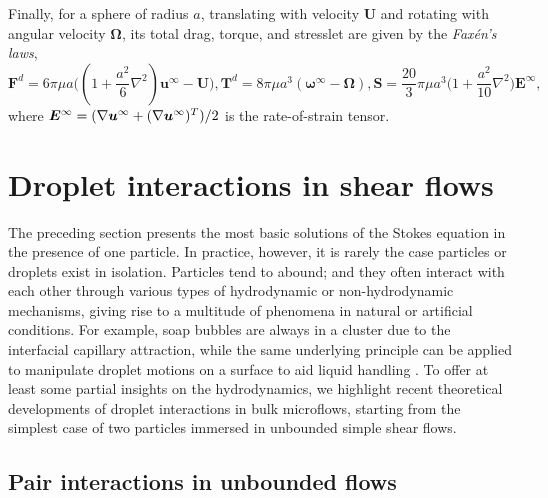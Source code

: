 Finally, for a sphere of radius $a$, translating with velocity $\bm U$ and rotating with angular velocity $\bm \Omega$, its total drag, torque, and stresslet are given by the \emph{Fax\'{e}n's laws},
\begin{subequations} \label{eq:faxen}
 \begin{equation}
   {\bm F}^{d} = 6\pi\mu a\bigg( (1+\frac{a^2}{6}\nabla^2){\bm u^\infty - {\bm U}} \bigg) ,
 \end{equation}
 \begin{equation}
  {\bm T}^{d} = 8\pi\mu a^3 ({\bm \omega}^\infty - {\bm \Omega}),
 \end{equation}
 \begin{equation}
   {\bm S} = \frac{20}{3}\pi\mu a^3 \bigg( 1+\frac{a^2}{10}\nabla^2 \bigg) {\bm E}^\infty ,
 \end{equation}
\end{subequations}
where $\small {\bm E}^\infty=(\nabla {\bm u}^\infty + (\nabla {\bm u}^\infty)^T)/2$ is the rate-of-strain tensor.


\section{Droplet interactions in shear flows}

The preceding section presents the most basic solutions of the Stokes equation in the presence of one particle.
In practice, however, it is rarely the case particles or droplets exist in isolation.
Particles tend to abound; and they often interact with each other through various types of hydrodynamic or non-hydrodynamic mechanisms, giving rise to a multitude of phenomena in natural or artificial conditions.
For example, soap bubbles are always in a cluster due to the interfacial capillary attraction, while the same underlying principle can be applied to manipulate droplet motions on a surface to aid liquid handling \citep{vapour-sensing}.
To offer at least some partial insights on the hydrodynamics, we highlight recent theoretical developments of droplet interactions in bulk microflows, starting from the simplest case of two particles immersed in unbounded simple shear flows.

\subsection{Pair interactions in unbounded flows}

